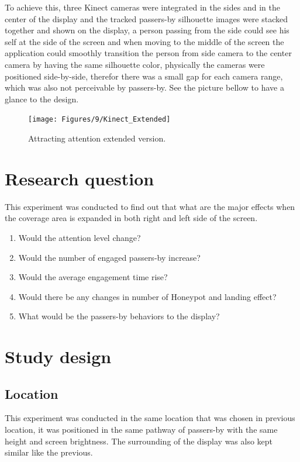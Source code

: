 To achieve this, three Kinect cameras were integrated in the sides and in the center of the display and the tracked passers-by silhouette images were stacked together and shown on the display, a person passing from the side could see his self at the side of the screen and when moving to the middle of the screen the application could smoothly transition the person from side camera to the center camera by having the same silhouette color, physically the cameras were positioned side-by-side, therefor there was a small gap for each camera range, which was also not perceivable by passers-by. See the picture bellow to have a glance to the design. 


\begin{figure}[H]
    \centering
    \texttt{[image: Figures/9/Kinect\_Extended]}
    \caption{Attracting attention extended version.}%
    \label{fig:KinectExtended}%
\end{figure}




\section{Research question}
This experiment was conducted to find out that what are the major effects when the coverage area is expanded in both right and left side of the screen.

\begin{enumerate}
\item Would the attention level change?
\item Would the number of engaged passers-by increase?
\item Would the average engagement time rise?
\item Would there be any changes in number of Honeypot and landing effect?
\item What would be the passers-by behaviors to the display?
\end{enumerate}



\section{Study design}

\subsection{Location}
This experiment was conducted in the same location that was chosen in previous location, it was positioned in the same pathway of passers-by with the same height and screen brightness.  The surrounding of the display was also kept similar like the previous. 


